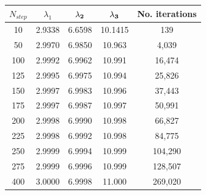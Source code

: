 \documentclass[11pt,a4wide]{article}
\begin{document}
\begin{enumerate}
\begin{center}
    \begin{tabular}{| c | c | c | c | c |}
    \hline
    \bf$ N_{step}$	& \bf $\lambda_{1}$	 & $\bf \lambda_{2}$	 & $\bf \lambda_{3}$	 & 	\bf No. iterations \\ \hline
	10 & 2.9338	 & 6.6598 &  10.1415 & 139 \\ \hline
	50 & 2.9970  & 6.9850  & 10.963 & 4,039 \\ \hline
	100 & 2.9992 & 6.9962 & 10.991 & 16,474 \\ \hline
	125 & 2.9995 & 6.9975 & 10.994 & 25,826 \\ \hline
	150 & 2.9997 & 6.9983  & 10.996 & 37,443 \\ \hline
	175 & 2.9997 & 6.9987 	& 10.997 & 50,991 \\ \hline
	200 & 2.9998 & 6.9990 	& 10.998 & 66,827 \\ \hline
	225 & 2.9998 & 6.9992	& 10.998 & 84,775 \\ \hline
	250 & 2.9999 & 6.9994 	& 10.999 & 104,290 \\ \hline
	275 & 2.9999 & 6.9996 	& 10.999 & 128,507 \\ \hline
	400 & 3.0000 & 6.9998 	& 11.000 & 269,020 \\ 
	 \hline	
    \end{tabular}
\end{center}


\end{enumerate}
\end{document}
